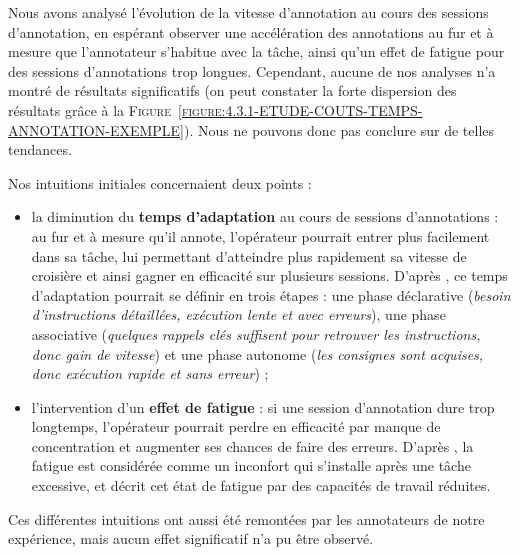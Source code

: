 			Nous avons analysé l'évolution de la vitesse d'annotation au cours des sessions d'annotation, en espérant observer une accélération des annotations au fur et à mesure que l'annotateur s'habitue avec la tâche, ainsi qu'un effet de fatigue pour des sessions d'annotations trop longues.
			Cependant, aucune de nos analyses n'a montré de résultats significatifs (on peut constater la forte dispersion des résultats grâce à la \textsc{Figure~\ref{figure:4.3.1-ETUDE-COUTS-TEMPS-ANNOTATION-EXEMPLE}}).
			Nous ne pouvons donc pas conclure sur de telles tendances.
			
			\begin{leftBarAuthorOpinion}
				Nos intuitions initiales concernaient deux points :
				\begin{itemize}
					\item la diminution du \textbf{temps d'adaptation} au cours de sessions d'annotations : au fur et à mesure qu'il annote, l'opérateur pourrait entrer plus facilement dans sa tâche, lui permettant d'atteindre plus rapidement sa vitesse de croisière et ainsi gagner en efficacité sur plusieurs sessions.
					D'après \cite{anderson:2013:architecture-cognition}, ce temps d'adaptation pourrait se définir en trois étapes : une phase déclarative (\textit{besoin d'instructions détaillées, exécution lente et avec erreurs}), une phase associative (\textit{quelques rappels clés suffisent pour retrouver les instructions, donc gain de vitesse}) et une phase autonome (\textit{les consignes sont acquises, donc exécution rapide et sans erreur}) ;
					\item l'intervention d'un \textbf{effet de fatigue} : si une session d'annotation dure trop longtemps, l'opérateur pourrait perdre en efficacité par manque de concentration et augmenter ses chances de faire des erreurs.
					D'après \cite{jones-etal:2015:demographic-occupational-predictors}, la fatigue est considérée comme un inconfort qui s'installe après une tâche excessive, et \cite{elkosantini-gien:2009:integration-human-behavioural} décrit cet état de fatigue par des capacités de travail réduites.
				\end{itemize}
				Ces différentes intuitions ont aussi été remontées par les annotateurs de notre expérience, mais aucun effet significatif n'a pu être observé.
			\end{leftBarAuthorOpinion}
		
